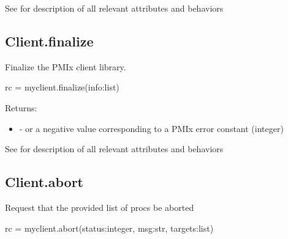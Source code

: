 See  for description of all relevant attributes and behaviors

\subsection{Client.finalize}

\summary

Finalize the PMIx client library.

\format

\pyspecificstart
\begin{codepar}
rc = myclient.finalize(info:list)
\end{codepar}
\pyspecificend

\begin{arglist}
\end{arglist}

Returns:

\begin{itemize}
    \item {} -  or a negative value corresponding to a PMIx error constant (integer)
\end{itemize}


See  for description of all relevant attributes and behaviors


\subsection{Client.abort}

\summary

Request that the provided list of procs be aborted

\format

\pyspecificstart
\begin{codepar}
rc = myclient.abort(status:integer, msg:str, targets:list)
\end{codepar}
\pyspecificend

\begin{arglist}
\end{arglist}

